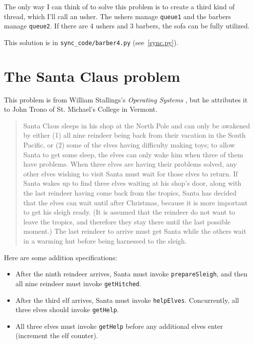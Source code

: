\documentclass{book}
\newcommand{\clearemptydoublepage}{\newpage\cleardoublepage}
\begin{document}
The only way I can think of to solve this problem is to create a third
kind of thread, which I'll call an usher.  The ushers manage {\tt queue1}
and the barbers manage {\tt queue2}.  If there are 4 ushers and 3 barbers,
the sofa can be fully utilized.

This solution is in \verb"sync_code/barber4.py" (see~\ref{sync.py}).


\clearemptydoublepage
\section{The Santa Claus problem}

This problem is from William Stallings's
{\em Operating Systems} \cite{stallings},
but he attributes it to John Trono of St. Michael's College in
Vermont.

\begin{quotation}
Santa Claus sleeps in his shop at the North Pole and can only be
awakened by either (1) all nine reindeer being back from their
vacation in the South Pacific, or (2) some of the elves having
difficulty making toys; to allow Santa to get some sleep, the elves
can only wake him when three of them have problems.  When three elves
are having their problems solved, any other elves wishing to visit
Santa must wait for those elves to return.  If Santa wakes up to find
three elves waiting at his shop's door, along with the last reindeer
having come back from the tropics, Santa has decided that the elves can
wait until after Christmas, because it is more important to get his
sleigh ready.  (It is assumed that the reindeer do not want to leave
the tropics, and therefore they stay there until the last possible
moment.)  The last reindeer to arrive must get Santa while the others
wait in a warming hut before being harnessed to the sleigh.
\end{quotation}

Here are some addition specifications:

\begin {itemize}

\item After the ninth reindeer arrives, Santa must invoke 
{\tt prepareSleigh}, and then all nine reindeer must
invoke {\tt getHitched}.

\item After the third elf arrives, Santa must invoke {\tt helpElves}.
Concurrently, all three elves should invoke {\tt getHelp}.

\item All three elves must invoke {\tt getHelp} before any additional
elves enter (increment the elf counter).

\end {itemize}
\end{document}
